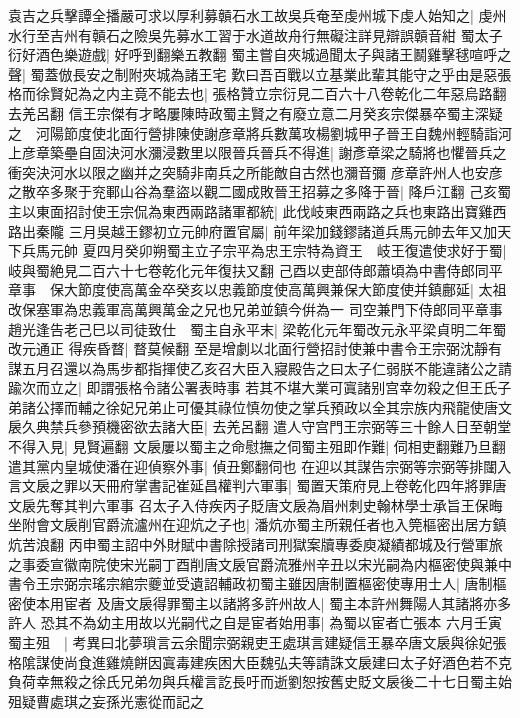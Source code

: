 袁吉之兵擊譚全播嚴可求以厚利募贑石水工故吳兵奄至虔州城下虔人始知之|{
	虔州水行至吉州有贑石之險吳先募水工習于水道故舟行無礙注詳見辯誤贑音紺}
蜀太子衍好酒色樂遊戲|{
	好呼到翻樂五教翻}
蜀主嘗自夾城過聞太子與諸王鬭雞擊毬喧呼之聲|{
	蜀蓋倣長安之制附夾城為諸王宅}
歎曰吾百戰以立基業此輩其能守之乎由是惡張格而徐賢妃為之内主竟不能去也|{
	張格贊立宗衍見二百六十八卷乾化二年惡烏路翻去羌呂翻}
信王宗傑有才略屢陳時政蜀主賢之有廢立意二月癸亥宗傑暴卒蜀主深疑之　河陽節度使北面行營排陳使謝彦章將兵數萬攻楊劉城甲子晉王自魏州輕騎詣河上彦章築壘自固決河水瀰浸數里以限晉兵晉兵不得進|{
	謝彥章梁之騎將也懼晉兵之衝突決河水以限之幽并之突騎非南兵之所能敵自古然也瀰音彌}
彦章許州人也安彦之散卒多聚于兖鄆山谷為羣盜以觀二國成敗晉王招募之多降于晉|{
	降戶江翻}
己亥蜀主以東面招討使王宗侃為東西兩路諸軍都統|{
	此伐岐東西兩路之兵也東路出寶雞西路出秦隴}
三月吳越王鏐初立元帥府置官屬|{
	前年梁加錢鏐諸道兵馬元帥去年又加天下兵馬元帥}
夏四月癸卯朔蜀主立子宗平為忠王宗特為資王　岐王復遣使求好于蜀|{
	岐與蜀絶見二百六十七卷乾化元年復扶又翻}
己酉以吏部侍郎蕭頃為中書侍郎同平章事　保大節度使高萬金卒癸亥以忠義節度使高萬興兼保大節度使并鎮鄜延|{
	太祖改保塞軍為忠義軍高萬興萬金之兄也兄弟並鎮今倂為一}
司空兼門下侍郎同平章事趙光逢告老己巳以司徒致仕　蜀主自永平末|{
	梁乾化元年蜀改元永平梁貞明二年蜀改元通正}
得疾昏瞀|{
	瞀莫候翻}
至是增劇以北面行營招討使兼中書令王宗弼沈靜有謀五月召還以為馬步都指揮使乙亥召大臣入寢殿告之曰太子仁弱朕不能違諸公之請踰次而立之|{
	即謂張格令諸公署表時事}
若其不堪大業可寘諸别宫幸勿殺之但王氏子弟諸公擇而輔之徐妃兄弟止可優其祿位慎勿使之掌兵預政以全其宗族内飛龍使唐文扆久典禁兵參預機密欲去諸大臣|{
	去羌呂翻}
遣人守宫門王宗弼等三十餘人日至朝堂不得入見|{
	見賢遍翻}
文扆屢以蜀主之命慰撫之伺蜀主殂即作難|{
	伺相吏翻難乃旦翻}
遣其黨内皇城使潘在迎偵察外事|{
	偵丑鄭翻伺也}
在迎以其謀告宗弼等宗弼等排闥入言文扆之罪以天冊府掌書記崔延昌權判六軍事|{
	蜀置天策府見上卷乾化四年將罪唐文扆先奪其判六軍事}
召太子入侍疾丙子貶唐文扆為眉州刺史翰林學士承旨王保晦坐附會文扆削官爵流瀘州在迎炕之子也|{
	潘炕亦蜀主所親任者也入筦樞密出居方鎮炕苦浪翻}
丙申蜀主詔中外財賦中書除授諸司刑獄案牘專委庾凝績都城及行營軍旅之事委宣徽南院使宋光嗣丁酉削唐文扆官爵流雅州辛丑以宋光嗣為内樞密使與兼中書令王宗弼宗瑤宗綰宗夔並受遺詔輔政初蜀主雖因唐制置樞密使專用士人|{
	唐制樞密使本用宦者}
及唐文扆得罪蜀主以諸將多許州故人|{
	蜀主本許州舞陽人其諸將亦多許人}
恐其不為幼主用故以光嗣代之自是宦者始用事|{
	為蜀以宦者亡張本}
六月壬寅蜀主殂　|{
	考異曰北夢瑣言云余聞宗弼親吏王處琪言建疑信王暴卒唐文扆與徐妃張格隂謀使尚食進雞燒餅因寘毒建疾困大臣魏弘夫等請誅文扆建曰太子好酒色若不克負荷幸無殺之徐氏兄弟勿與兵權言訖長吁而逝劉恕按舊史貶文扆後二十七日蜀主始殂疑曹處琪之妄孫光憲從而記之}
